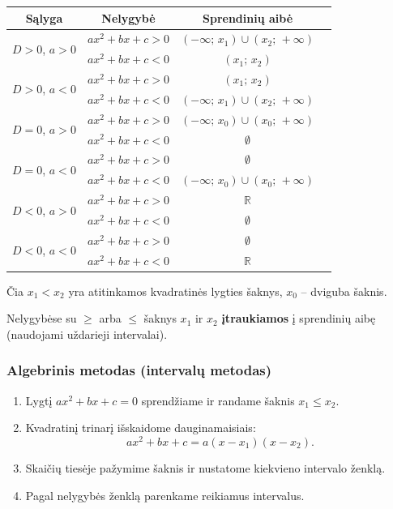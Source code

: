 \begin{center}
\begin{tabular}{|c|c|c|c|}
\hline
\textbf{Sąlyga} & \textbf{Nelygybė} & \textbf{Sprendinių aibė} \\
\hline
\multirow{2}{*}{$D > 0$, $a > 0$} & $ax^2+bx+c > 0$ & $(-\infty;\, x_1) \cup (x_2;\, +\infty)$ \\
                                   & $ax^2+bx+c < 0$ & $(x_1;\, x_2)$ \\
\hline
\multirow{2}{*}{$D > 0$, $a < 0$} & $ax^2+bx+c > 0$ & $(x_1;\, x_2)$ \\
                                   & $ax^2+bx+c < 0$ & $(-\infty;\, x_1) \cup (x_2;\, +\infty)$ \\
\hline
\multirow{2}{*}{$D = 0$, $a > 0$} & $ax^2+bx+c > 0$ & $(-\infty;\, x_0) \cup (x_0;\, +\infty)$ \\
                                   & $ax^2+bx+c < 0$ & $\emptyset$ \\
\hline
\multirow{2}{*}{$D = 0$, $a < 0$} & $ax^2+bx+c > 0$ & $\emptyset$ \\
                                   & $ax^2+bx+c < 0$ & $(-\infty;\, x_0) \cup (x_0;\, +\infty)$ \\
\hline
\multirow{2}{*}{$D < 0$, $a > 0$} & $ax^2+bx+c > 0$ & $\mathbb{R}$ \\
                                   & $ax^2+bx+c < 0$ & $\emptyset$ \\
\hline
\multirow{2}{*}{$D < 0$, $a < 0$} & $ax^2+bx+c > 0$ & $\emptyset$ \\
                                   & $ax^2+bx+c < 0$ & $\mathbb{R}$ \\
\hline
\end{tabular}
\end{center}

\noindent Čia $x_1 < x_2$ yra atitinkamos kvadratinės lygties šaknys, $x_0$ – dviguba šaknis.

\begin{remark}
Nelygybėse su $\geq$ arba $\leq$ šaknys $x_1$ ir $x_2$ \textbf{įtraukiamos} į sprendinių aibę (naudojami uždarieji intervalai).
\end{remark}

\subsubsection*{Algebrinis metodas (intervalų metodas)}

\begin{enumerate}
    \item Lygtį $ax^2 + bx + c = 0$ sprendžiame ir randame šaknis $x_1 \leq x_2$.
    \item Kvadratinį trinarį išskaidome dauginamaisiais:
    \[
    ax^2 + bx + c = a(x - x_1)(x - x_2).
    \]
    \item Skaičių tiesėje pažymime šaknis ir nustatome kiekvieno intervalo ženklą.
    \item Pagal nelygybės ženklą parenkame reikiamus intervalus.
\end{enumerate}

